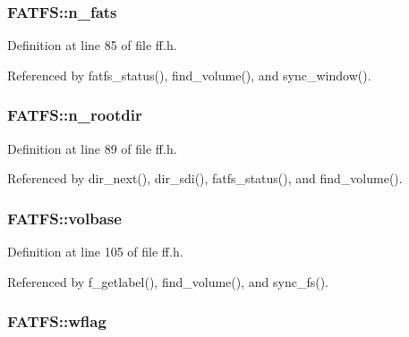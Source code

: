 \subsubsection[{\texorpdfstring{n\+\_\+fats}{n_fats}}]{ F\+A\+T\+F\+S\+::n\+\_\+fats}\hypertarget{structFATFS_a56716c7e7ac10cf46e73ffb2a2e9b545}{}\label{structFATFS_a56716c7e7ac10cf46e73ffb2a2e9b545}


Definition at line 85 of file ff.\+h.



Referenced by fatfs\+\_\+status(), find\+\_\+volume(), and sync\+\_\+window().

\subsubsection[{\texorpdfstring{n\+\_\+rootdir}{n_rootdir}}]{ F\+A\+T\+F\+S\+::n\+\_\+rootdir}\hypertarget{structFATFS_a189a00aa038044ffad0fc7f7dcf2aae1}{}\label{structFATFS_a189a00aa038044ffad0fc7f7dcf2aae1}


Definition at line 89 of file ff.\+h.



Referenced by dir\+\_\+next(), dir\+\_\+sdi(), fatfs\+\_\+status(), and find\+\_\+volume().

\subsubsection[{\texorpdfstring{volbase}{volbase}}]{ F\+A\+T\+F\+S\+::volbase}\hypertarget{structFATFS_a8f0ca578755749d204f59dc83f1a7649}{}\label{structFATFS_a8f0ca578755749d204f59dc83f1a7649}


Definition at line 105 of file ff.\+h.



Referenced by f\+\_\+getlabel(), find\+\_\+volume(), and sync\+\_\+fs().

\subsubsection[{\texorpdfstring{wflag}{wflag}}]{ F\+A\+T\+F\+S\+::wflag}\hypertarget{structFATFS_a647e43c9ccae94b7274793d1909897de}{}\label{structFATFS_a647e43c9ccae94b7274793d1909897de}


